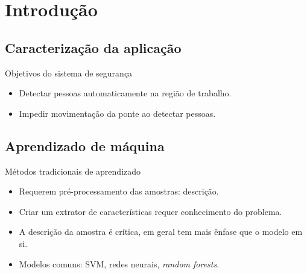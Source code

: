 \section{Introdução}

\subsection{Caracterização da aplicação}
	\begin{frame}{\insertsubsection}
	\end{frame}

	\begin{frame}{\insertsubsection}
	\end{frame}

	\begin{frame}{\insertsubsection}
	\end{frame}

	\begin{frame}{Objetivos do sistema de segurança}
		\begin{itemize}
			\item Detectar pessoas automaticamente na região de trabalho.
			\item Impedir movimentação da ponte ao detectar pessoas.
		\end{itemize}
	\end{frame}

\subsection{Aprendizado de máquina}

	\begin{frame}{Métodos tradicionais de aprendizado}
		\begin{itemize}
			\item Requerem pré-processamento das amostras: descrição.
			\item Criar um extrator de características requer conhecimento do problema.
			\item A descrição da amostra é crítica, em geral tem mais ênfase que o modelo em si.
			\item Modelos comuns: SVM, redes neurais, \emph{random forests}.
		\end{itemize}
	\end{frame}
	
